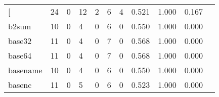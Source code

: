 \begin{longtable}{lp{1.20cm}p{1.20cm}p{1.20cm}p{1.20cm}p{1.20cm}p{1.20cm}p{1.20cm}p{1.20cm}p{1.20cm}p{1.20cm}}
\bottomrule
\endlastfoot
{[}         &                                    24 &                                                  0 &                                                 12 &                                                  2 &                                                  6 &                                                  4 &                                         0.521 &                                              1.000 &                                              0.167 \\
b2sum     &                                    10 &                                                  0 &                                                  4 &                                                  0 &                                                  6 &                                                  0 &                                         0.550 &                                              1.000 &                                              0.000 \\
base32    &                                    11 &                                                  0 &                                                  4 &                                                  0 &                                                  7 &                                                  0 &                                         0.568 &                                              1.000 &                                              0.000 \\
base64    &                                    11 &                                                  0 &                                                  4 &                                                  0 &                                                  7 &                                                  0 &                                         0.568 &                                              1.000 &                                              0.000 \\
basename  &                                    10 &                                                  0 &                                                  4 &                                                  0 &                                                  6 &                                                  0 &                                         0.550 &                                              1.000 &                                              0.000 \\
basenc    &                                    11 &                                                  0 &                                                  5 &                                                  0 &                                                  6 &                                                  0 &                                         0.523 &                                              1.000 &                                              0.000 \\

\end{longtable}
